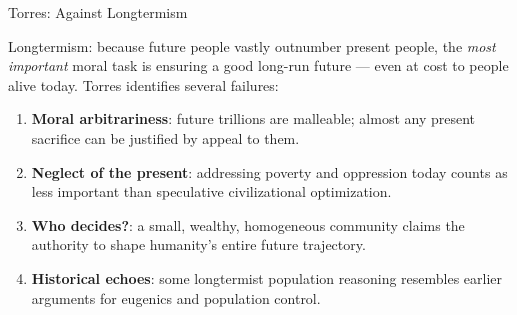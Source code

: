 \documentclass[aspectratio=169,11pt]{beamer}
\begin{document}
\begin{frame}[shrink=18]{Torres: Against Longtermism}
\begin{objectionbox}
Longtermism: because future people vastly outnumber present people, the \emph{most important} moral task is ensuring a good long-run future --- even at cost to people alive today. Torres identifies several failures:
\begin{enumerate}
    \item \textbf{Moral arbitrariness}: future trillions are malleable; almost any present sacrifice can be justified by appeal to them.
    \item \textbf{Neglect of the present}: addressing poverty and oppression today counts as less important than speculative civilizational optimization.
    \item \textbf{Who decides?}: a small, wealthy, homogeneous community claims the authority to shape humanity's entire future trajectory.
    \item \textbf{Historical echoes}: some longtermist population reasoning resembles earlier arguments for eugenics and population control.
\end{enumerate}
\end{objectionbox}
\parencite{torres_against_longtermism_2021}
\end{frame}
\end{document}
